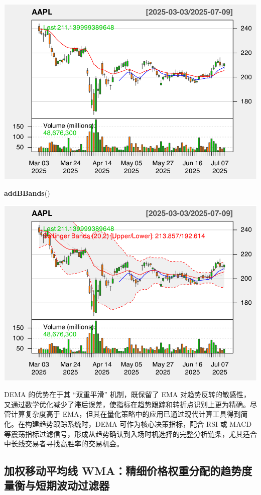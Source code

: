 \documentclass[]{ctexbook}
\newenvironment{Shaded}{\begin{snugshade}}{\end{snugshade}}
\newcommand{\FunctionTok}[1]{\textcolor[rgb]{0.13,0.29,0.53}{\textbf{#1}}}
\newcommand{\NormalTok}[1]{#1}
\begin{document}
\includegraphics[width=0.9\linewidth]{quantmod_files/figure-latex/dema_2-3}

\begin{Shaded}
\begin{Highlighting}[]
\FunctionTok{addBBands}\NormalTok{()}
\end{Highlighting}
\end{Shaded}

\includegraphics[width=0.9\linewidth]{quantmod_files/figure-latex/dema_2-4}

DEMA 的优势在于其 ``双重平滑'' 机制，既保留了 EMA 对趋势反转的敏感性，又通过数学优化减少了滞后误差，使指标在趋势跟踪和转折点识别上更为精确。尽管计算复杂度高于 EMA，但其在量化策略中的应用已通过现代计算工具得到简化。在构建趋势跟踪系统时，DEMA 可作为核心决策指标，配合 RSI 或 MACD 等震荡指标过滤信号，形成从趋势确认到入场时机选择的完整分析链条，尤其适合中长线交易者寻找高胜率的交易机会。

\subsection{加权移动平均线 WMA：精细价格权重分配的趋势度量衡与短期波动过滤器}\label{ux52a0ux6743ux79fbux52a8ux5e73ux5747ux7ebf-wmaux7cbeux7ec6ux4ef7ux683cux6743ux91cdux5206ux914dux7684ux8d8bux52bfux5ea6ux91cfux8861ux4e0eux77edux671fux6ce2ux52a8ux8fc7ux6ee4ux5668}
\end{document}
